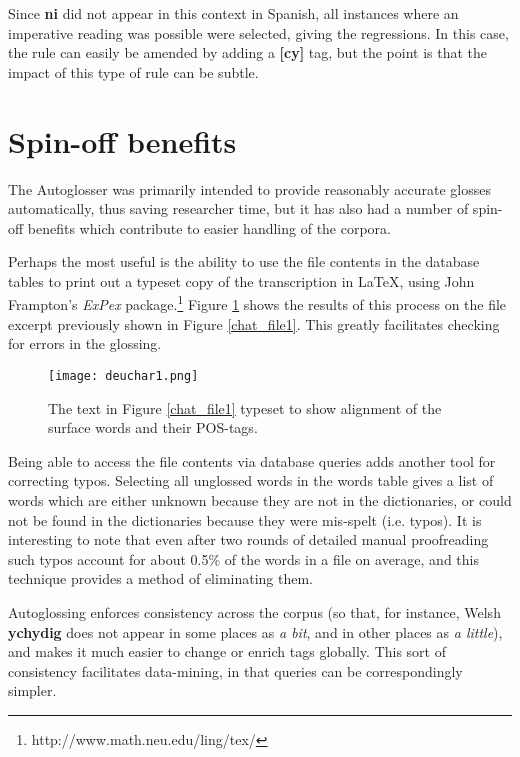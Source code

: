 \documentclass[11pt]{article}
\begin{document}
\noindent Since \textbf{ni} did not appear in this context in Spanish, all instances where an imperative reading was possible were selected, giving the regressions.  In this case, the rule can easily be amended by adding a \textbf{[cy]} tag, but the point is that the impact of this type of rule can be subtle.


\section{Spin-off benefits}
\label{sec:benefits}


The Autoglosser was primarily intended to provide reasonably accurate glosses automatically, thus saving researcher time, but it has also had a number of spin-off benefits which contribute to easier handling of the corpora.

Perhaps the most useful is the ability to use the file contents in the database tables to print out a typeset copy of the transcription in \LaTeX, using John Frampton's \textit{ExPex} package.\footnote{http://www.math.neu.edu/ling/tex/}  Figure \ref{expex} shows the results of this process on the file excerpt previously shown in Figure \ref{chat_file1}. This greatly facilitates checking for errors in the glossing.

\begin{figure}[!hbtp]
\centering
\texttt{[image: deuchar1.png]}
\caption{The text in Figure \ref{chat_file1} typeset to show alignment of the surface words and their POS-tags.}
\label{expex}
\end{figure}

Being able to access the file contents via database queries adds another tool for correcting typos.  Selecting all unglossed words in the words table gives a list of words which are either unknown because they are not in the dictionaries, or could not be found in the dictionaries because they were mis-spelt (i.e. typos).  It is interesting to note that even after two rounds of detailed manual proofreading such typos account for about 0.5\% of the words in a file on average, and this technique provides a method of eliminating them.

Autoglossing enforces consistency across the corpus (so that, for instance, Welsh \textbf{ychydig} does not appear in some places as \textit{a bit}, and in other places as \textit{a little}), and makes it much easier to change or enrich tags globally.  This sort of consistency facilitates data-mining, in that queries can be correspondingly simpler.
\end{document}
